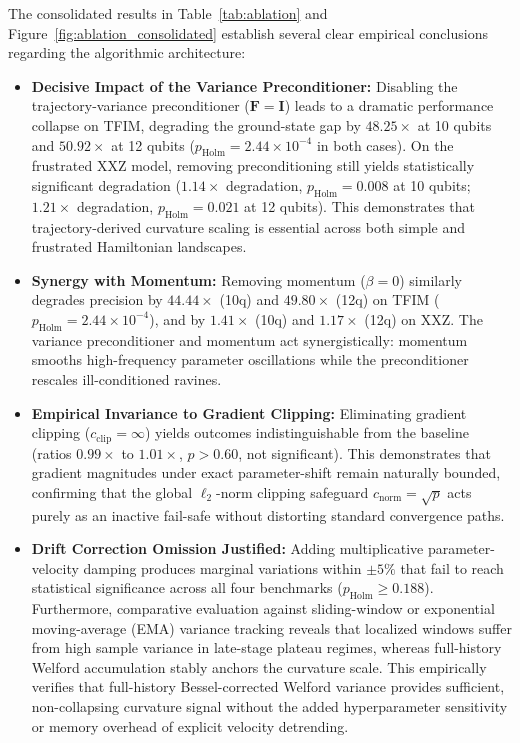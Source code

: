 \documentclass[11pt,a4paper]{article}
\begin{document}
The consolidated results in Table~\ref{tab:ablation} and Figure~\ref{fig:ablation_consolidated} establish several clear empirical conclusions regarding the algorithmic architecture:
\begin{itemize}
    \item \textbf{Decisive Impact of the Variance Preconditioner:} Disabling the trajectory-variance preconditioner ($\mathbf{F}=\mathbf{I}$) leads to a dramatic performance collapse on TFIM, degrading the ground-state gap by $48.25\times$ at 10 qubits and $50.92\times$ at 12 qubits ($p_{\text{Holm}} = 2.44 \times 10^{-4}$ in both cases). On the frustrated XXZ model, removing preconditioning still yields statistically significant degradation ($1.14\times$ degradation, $p_{\text{Holm}} = 0.008$ at 10 qubits; $1.21\times$ degradation, $p_{\text{Holm}} = 0.021$ at 12 qubits). This demonstrates that trajectory-derived curvature scaling is essential across both simple and frustrated Hamiltonian landscapes.
    \item \textbf{Synergy with Momentum:} Removing momentum ($\beta=0$) similarly degrades precision by $44.44\times$ (10q) and $49.80\times$ (12q) on TFIM ($p_{\text{Holm}} = 2.44 \times 10^{-4}$), and by $1.41\times$ (10q) and $1.17\times$ (12q) on XXZ. The variance preconditioner and momentum act synergistically: momentum smooths high-frequency parameter oscillations while the preconditioner rescales ill-conditioned ravines.
    \item \textbf{Empirical Invariance to Gradient Clipping:} Eliminating gradient clipping ($c_{\text{clip}}=\infty$) yields outcomes indistinguishable from the baseline (ratios $0.99\times$ to $1.01\times$, $p > 0.60$, not significant). This demonstrates that gradient magnitudes under exact parameter-shift remain naturally bounded, confirming that the global $\ell_2$-norm clipping safeguard $c_{\text{norm}} = \sqrt{p}$ acts purely as an inactive fail-safe without distorting standard convergence paths.
    \item \textbf{Drift Correction Omission Justified:} Adding multiplicative parameter-velocity damping produces marginal variations within $\pm 5\%$ that fail to reach statistical significance across all four benchmarks ($p_{\text{Holm}} \ge 0.188$). Furthermore, comparative evaluation against sliding-window or exponential moving-average (EMA) variance tracking reveals that localized windows suffer from high sample variance in late-stage plateau regimes, whereas full-history Welford accumulation stably anchors the curvature scale. This empirically verifies that full-history Bessel-corrected Welford variance provides sufficient, non-collapsing curvature signal without the added hyperparameter sensitivity or memory overhead of explicit velocity detrending.
\end{itemize}
\end{document}
